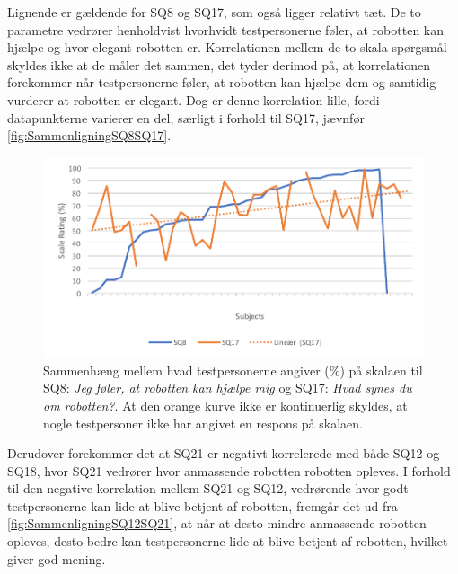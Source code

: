 \noindent
%
Lignende er gældende for SQ8 og SQ17, som også ligger relativt tæt. De to parametre vedrører henholdvist hvorhvidt testpersonerne føler, at robotten kan hjælpe og hvor elegant robotten er. Korrelationen mellem de to skala spørgsmål skyldes ikke at de måler det sammen, det tyder derimod på, at korrelationen forekommer når testpersonerne føler, at robotten kan hjælpe dem og samtidig vurderer at robotten er elegant. Dog er denne korrelation lille, fordi datapunkterne varierer en del, særligt i forhold til SQ17, jævnfør \autoref{fig:SammenligningSQ8SQ17}.  
%
\begin{figure}[H]
	\centering
	\includegraphics[width=\textwidth]{Figure/Korrelationsgrafer/SQ8+SQ17}
	\caption{Sammenhæng mellem hvad testpersonerne angiver (\%) på skalaen til SQ8: \textit{Jeg føler, at robotten kan hjælpe mig} og SQ17: \textit{Hvad synes du om robotten?}. At den orange kurve ikke er kontinuerlig skyldes, at nogle testpersoner ikke har angivet en respons på skalaen.}
	\label{fig:SammenligningSQ8SQ17}
\end{figure}
\noindent
%
Derudover forekommer det at SQ21 er negativt korrelerede med både SQ12 og SQ18, hvor SQ21 vedrører hvor anmassende robotten robotten opleves. I forhold til den negative korrelation mellem SQ21 og SQ12, vedrørende hvor godt testpersonerne kan lide at blive betjent af robotten, fremgår det ud fra \autoref{fig:SammenligningSQ12SQ21}, at når at desto mindre anmassende robotten opleves, desto bedre kan testpersonerne lide at blive betjent af robotten, hvilket giver god mening. 
%
